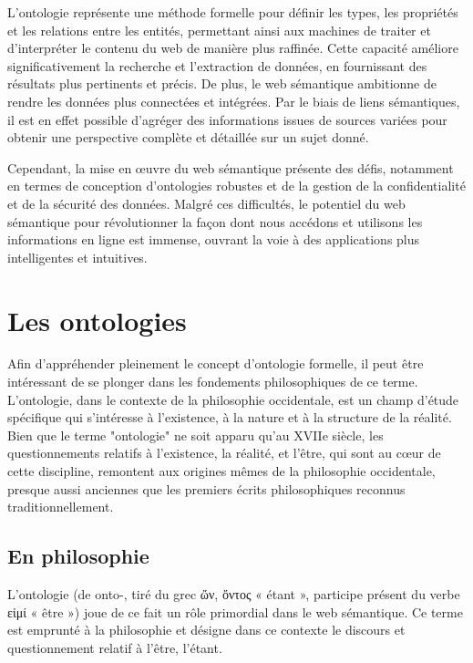 \documentclass[12pt]{report}
\begin{document}
L'ontologie représente une méthode formelle pour définir les types, les propriétés et les relations entre les entités, permettant ainsi aux machines de traiter et d'interpréter le contenu du web de manière plus raffinée. Cette capacité améliore significativement la recherche et l'extraction de données, en fournissant des résultats plus pertinents et précis.
De plus, le web sémantique ambitionne de rendre les données plus connectées et intégrées. Par le biais de liens sémantiques, il est en effet possible d'agréger des informations issues de sources variées pour obtenir une perspective complète et détaillée sur un sujet donné.

Cependant, la mise en œuvre du web sémantique présente des défis, notamment en termes de conception d'ontologies robustes et de la gestion de la confidentialité et de la sécurité des données. Malgré ces difficultés, le potentiel du web sémantique pour révolutionner la façon dont nous accédons et utilisons les informations en ligne est immense, ouvrant la voie à des applications plus intelligentes et intuitives.

\chapter{Les ontologies}
Afin d'appréhender pleinement le concept d'ontologie formelle, il peut être intéressant de se plonger dans les fondements philosophiques de ce terme. L'ontologie, dans le contexte de la philosophie occidentale, est un champ d'étude spécifique qui s'intéresse à l'existence, à la nature et à la structure de la réalité. Bien que le terme "ontologie" ne soit apparu qu'au XVIIe siècle, les questionnements relatifs à l'existence, la réalité, et l'être, qui sont au cœur de cette discipline, remontent aux origines mêmes de la philosophie occidentale, presque aussi anciennes que les premiers écrits philosophiques reconnus traditionnellement.

\section{En philosophie}
L'ontologie (de onto-, tiré du grec \textgreek{ὤν, ὄντος} « étant », participe présent du verbe \textgreek{εἰμί} « être ») joue de ce fait un rôle primordial dans le web sémantique. Ce terme est emprunté à la philosophie et désigne dans ce contexte le discours et questionnement relatif à l'être, l'étant. 
\end{document}
